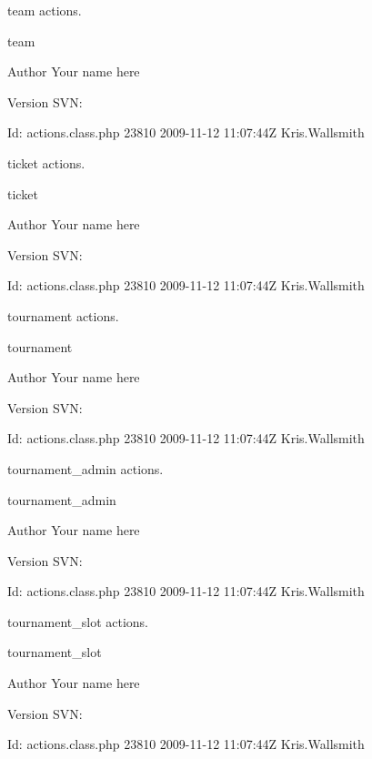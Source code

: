 team actions.

team \begin{DoxyAuthor}{Author}
Your name here 
\end{DoxyAuthor}
\begin{DoxyVersion}{Version}
S\-V\-N\-: 
\end{DoxyVersion}
\begin{DoxyParagraph}{Id\-:}
actions.\-class.\-php 23810 2009-\/11-\/12 11\-:07\-:44\-Z Kris.\-Wallsmith 
\end{DoxyParagraph}


ticket actions.

ticket \begin{DoxyAuthor}{Author}
Your name here 
\end{DoxyAuthor}
\begin{DoxyVersion}{Version}
S\-V\-N\-: 
\end{DoxyVersion}
\begin{DoxyParagraph}{Id\-:}
actions.\-class.\-php 23810 2009-\/11-\/12 11\-:07\-:44\-Z Kris.\-Wallsmith 
\end{DoxyParagraph}


tournament actions.

tournament \begin{DoxyAuthor}{Author}
Your name here 
\end{DoxyAuthor}
\begin{DoxyVersion}{Version}
S\-V\-N\-: 
\end{DoxyVersion}
\begin{DoxyParagraph}{Id\-:}
actions.\-class.\-php 23810 2009-\/11-\/12 11\-:07\-:44\-Z Kris.\-Wallsmith 
\end{DoxyParagraph}


tournament\-\_\-admin actions.

tournament\-\_\-admin \begin{DoxyAuthor}{Author}
Your name here 
\end{DoxyAuthor}
\begin{DoxyVersion}{Version}
S\-V\-N\-: 
\end{DoxyVersion}
\begin{DoxyParagraph}{Id\-:}
actions.\-class.\-php 23810 2009-\/11-\/12 11\-:07\-:44\-Z Kris.\-Wallsmith 
\end{DoxyParagraph}


tournament\-\_\-slot actions.

tournament\-\_\-slot \begin{DoxyAuthor}{Author}
Your name here 
\end{DoxyAuthor}
\begin{DoxyVersion}{Version}
S\-V\-N\-: 
\end{DoxyVersion}
\begin{DoxyParagraph}{Id\-:}
actions.\-class.\-php 23810 2009-\/11-\/12 11\-:07\-:44\-Z Kris.\-Wallsmith 
\end{DoxyParagraph}


